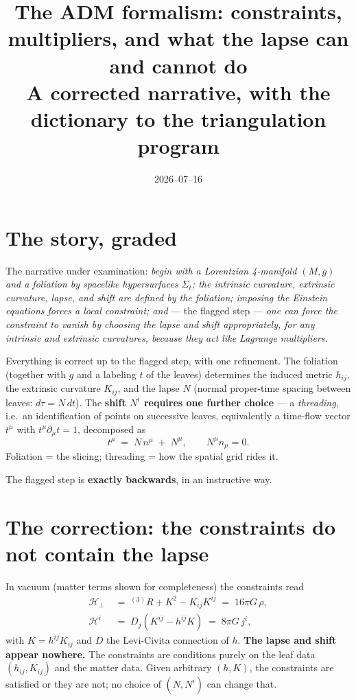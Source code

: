 \documentclass[11pt]{article}
\title{The ADM formalism: constraints, multipliers, and what the lapse can and cannot do\\
\large A corrected narrative, with the dictionary to the triangulation program}
\author{}
\date{2026--07--16}
\newcommand{\Hh}{\mathcal{H}}
\newcommand{\Rthree}{{}^{(3)}\!R}
\begin{document}
\maketitle

\section{The story, graded}

The narrative under examination: \emph{begin with a Lorentzian 4-manifold $(M,g)$ and a
foliation by spacelike hypersurfaces $\Sigma_t$; the intrinsic curvature, extrinsic
curvature, lapse, and shift are defined by the foliation; imposing the Einstein equations
forces a local constraint; and} --- the flagged step --- \emph{one can force the constraint
to vanish by choosing the lapse and shift appropriately, for any intrinsic and extrinsic
curvatures, because they act like Lagrange multipliers.}

Everything is correct up to the flagged step, with one refinement. The foliation (together
with $g$ and a labeling $t$ of the leaves) determines the induced metric $h_{ij}$, the
extrinsic curvature $K_{ij}$, and the lapse $N$ (normal proper-time spacing between
leaves: $d\tau = N\,dt$). The \textbf{shift $N^i$ requires one further choice} --- a
\emph{threading}, i.e.\ an identification of points on successive leaves, equivalently a
time-flow vector $t^\mu$ with $t^\mu\partial_\mu t = 1$, decomposed as
\[
t^\mu \;=\; N\,n^\mu \;+\; N^\mu, \qquad N^\mu n_\mu = 0 .
\]
Foliation = the slicing; threading = how the spatial grid rides it.

The flagged step is \textbf{exactly backwards}, in an instructive way.

\section{The correction: the constraints do not contain the lapse}

In vacuum (matter terms shown for completeness) the constraints read
\begin{align}
\Hh_\perp &\;=\; \Rthree + K^2 - K_{ij}K^{ij} \;=\; 16\pi G\,\rho ,\\
\Hh^i &\;=\; D_j\!\left(K^{ij} - h^{ij}K\right) \;=\; 8\pi G\, j^i ,
\end{align}
with $K = h^{ij}K_{ij}$ and $D$ the Levi-Civita connection of $h$. \textbf{The lapse and
shift appear nowhere.} The constraints are conditions purely on the leaf data
$(h_{ij}, K_{ij})$ and the matter data. Given arbitrary $(h,K)$, the constraints are
satisfied or they are not; no choice of $(N, N^i)$ can change that.
\end{document}
